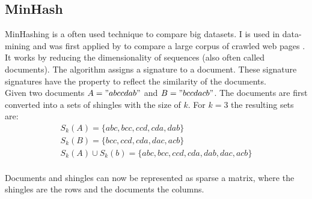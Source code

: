 \subsection{MinHash}
\label{ssec:minhash}

MinHashing is a often used technique to compare big datasets. I is used in data-mining and was first applied by \citeauthor{minhash} to compare a large corpus of crawled web pages \cite{minhash}. It works by reducing the dimensionality of sequences (also often called documents). The algorithm assigns a signature to a document. These signature signatures have the property to reflect the similarity of the documents.\\

Given two documents $ A = "abccdab" $ and $ B = "bccdacb" $. The documents are first converted into a sets of shingles with the size of $ k $. For $ k = 3 $ the resulting sets are: \\

\begin{equation}
    \begin{split}
        S_k(A) = \{abc, bcc, ccd, cda, dab\} \\
        S_k(B) = \{bcc, ccd, cda, dac, acb\} \\
        S_k(A) \cup S_k(b) = \{abc, bcc, ccd, cda, dab, dac, acb\}
    \end{split}
\end{equation}\\

Documents and shingles can now be represented as sparse a matrix, where the shingles are the rows and the documents the columns.





